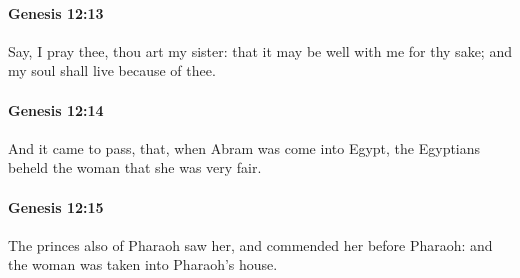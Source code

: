 		\paragraph{Genesis 12:13} %
			\label{GENESIS-12-13}

			Say, I pray thee, thou art my sister: that it may be well with me for thy sake; and my soul shall live because of thee.


		\paragraph{Genesis 12:14} %
			\label{GENESIS-12-14}

			And it came to pass, that, when Abram was come into Egypt, the Egyptians beheld the woman that she was very fair.


		\paragraph{Genesis 12:15} %
			\label{GENESIS-12-15}

			The princes also of Pharaoh saw her, and commended her before Pharaoh: and the woman was taken into Pharaoh's house.


